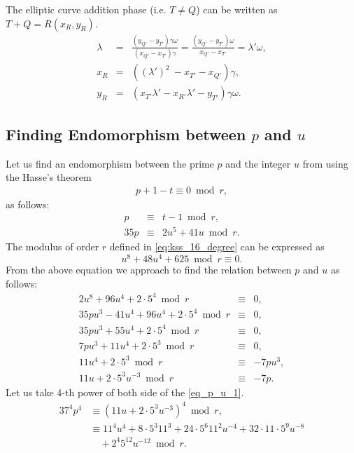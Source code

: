 The elliptic curve addition phase (i.e. $T\neq Q$) can be written as $T+Q = R(x_R, y_R)$.
\begin{eqnarray}
\lambda &=& \frac{( y_{Q'}-y_{T'})\gamma \omega}{( x_{Q'}-x_{T'})\gamma} = \frac{( y_{Q'}-y_{T'}) \omega}{x_{Q'}-x_{T'}} = \lambda' \omega, \nonumber\\
x_{R} & = & ((\lambda')^2  \ - x_{T'} -x_{Q'})\gamma, \nonumber \\
y_{R} & = &  (x_{T'}\lambda' -x_{R'}\lambda'-y_{T'})\gamma \omega \nonumber.
\end{eqnarray}
\subsection{Finding  Endomorphism between \texorpdfstring{$p$}{} and \texorpdfstring{$u$}{}}
Let us find an endomorphism between the prime $p$ and the integer $u$ from using the Hasse's theorem
\begin{eqnarray}
p+1 - t \equiv 0 \bmod r, \nonumber
\end{eqnarray}
as follows:
\begin{eqnarray}
p & \equiv & t-1 \bmod r, \nonumber \\
35p   & \equiv &  2u^5+41u \bmod r. \label{eq_pt1}
\end{eqnarray}
The modulus of order $r$ defined in \eqref{eq:kss_16_degree} can be expressed as 
\begin{equation}
u^8+48u^4+625 \bmod r \equiv  0 .\label{eq_order_mod}
\end{equation}
From the above equation we approach to find the relation between $p$ and $u$ as follows:
\begin{eqnarray}
2u^8+ 96u^4 + 2 \cdot 5^4\bmod r & \equiv & 0, \nonumber \\
35pu^3-41u^4 + 96u^4 + 2 \cdot 5^4 \bmod r & \equiv & 0,\nonumber \\
35pu^3+55u^4+2\cdot5^4 \bmod r & \equiv & 0, \nonumber \\
7pu^3+11u^4+2\cdot5^3 \bmod r & \equiv & 0, \nonumber \\
11u^4+2\cdot5^3 \bmod r & \equiv & -7pu^3, \nonumber \\
11u+2\cdot5^3u^{-3} \bmod r & \equiv & -7p. \label{eq_p_u_1}
\end{eqnarray}
Let us take 4-th power of both side of the \eqref{eq_p_u_1}.
\begin{alignat}{3}
7^4p^4 &  \equiv (11u+2\cdot5^3u^{-3})^4 \bmod r, \nonumber \\
& \equiv  11^4u^4 + 8 \cdot 5^3 11^3 + 24\cdot  5^6 11^2 u^{-4} + 32 \cdot 11 \cdot 5^9u^{-8} \nonumber \\
&  \quad  + 2^4 5^{12}u^{-12} \bmod r. \label{eq_74p4}
\end{alignat}
